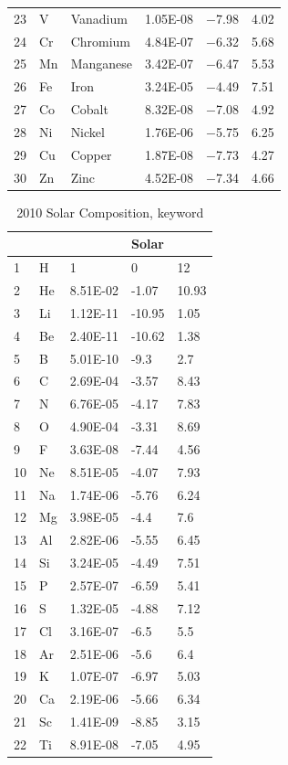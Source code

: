 \begin{table}
\begin{tabular}{llllll}
23& V& Vanadium& 1.05E-08& $-$7.98& 4.02\\
24& Cr& Chromium&  4.84E-07& $-$6.32& 5.68\\
25& Mn& Manganese& 3.42E-07& $-$6.47& 5.53\\
\hline
26& Fe& Iron& 3.24E-05& $-$4.49& 7.51\\
27& Co& Cobalt&  8.32E-08& $-$7.08& 4.92\\
28& Ni& Nickel&  1.76E-06& $-$5.75& 6.25\\
29& Cu& Copper& 1.87E-08& $-$7.73& 4.27\\
30& Zn& Zinc& 4.52E-08& $-$7.34& 4.66\\
\hline
\end{tabular}
\end{table}

\begin{table}
\centering
\caption{2010 Solar Composition, keyword \protect{}}
\label{tab:2010SolarComposition}
\begin{tabular}{lllll}
\hline
&&&Solar\\
\hline
1& H& 1& 0& 12\\
2& He& 8.51E-02& -1.07& 10.93\\
3& Li& 1.12E-11& -10.95& 1.05\\
4& Be& 2.40E-11& -10.62& 1.38\\
5& B& 5.01E-10& -9.3& 2.7\\
6& C& 2.69E-04& -3.57& 8.43\\
7& N& 6.76E-05& -4.17& 7.83\\
8& O& 4.90E-04& -3.31& 8.69\\
9& F& 3.63E-08& -7.44& 4.56\\
10& Ne& 8.51E-05& -4.07& 7.93\\
11& Na& 1.74E-06& -5.76& 6.24\\
12& Mg& 3.98E-05& -4.4& 7.6\\
13& Al& 2.82E-06& -5.55& 6.45\\
14& Si& 3.24E-05& -4.49& 7.51\\
15& P& 2.57E-07& -6.59& 5.41\\
16& S& 1.32E-05& -4.88& 7.12\\
17& Cl& 3.16E-07& -6.5& 5.5\\
18& Ar& 2.51E-06& -5.6& 6.4\\
19& K& 1.07E-07& -6.97& 5.03\\
20& Ca& 2.19E-06& -5.66& 6.34\\
21& Sc& 1.41E-09& -8.85& 3.15\\
22& Ti& 8.91E-08& -7.05& 4.95\\

\end{tabular}
\end{table}
